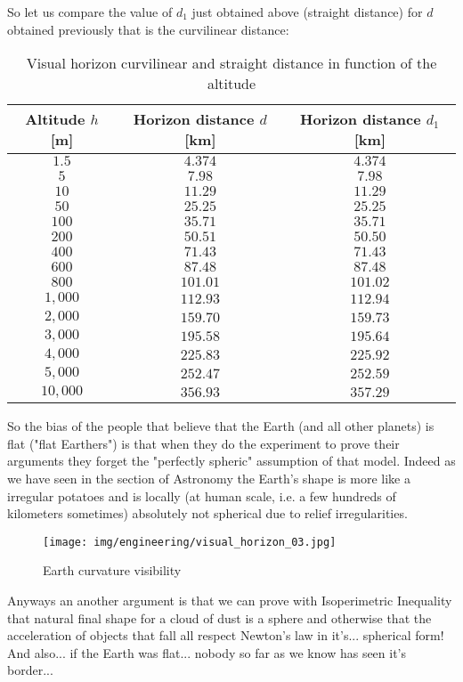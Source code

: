 	So let us compare the value of $d_1$ just obtained above (straight distance) for $d$ obtained previously that is the curvilinear distance:
	\begin{table}[H]
	\begin{center}
			\begin{tabular}{|c|c|c|}
				\hline
				\multicolumn{1}{c}{\cellcolor{black!30}\textbf{Altitude $h$ [m]}} & 
\multicolumn{1}{c}{\cellcolor{black!30}\textbf{Horizon distance $d$ [km]}}  & 
\multicolumn{1}{c}{\cellcolor{black!30}\textbf{Horizon distance $d_1$ [km]}} \\ \hline
		$1.5$ & $4.374$ & $4.374$\\ \hline
		$5$ & $7.98$ & $7.98$ \\ \hline
		$10$ & $11.29$ & $11.29$ \\ \hline
		$50$ & $25.25$ & $25.25$ \\ \hline
		$100$ & $35.71$ & $35.71$ \\ \hline
		$200$ & $50.51$ & $50.50$ \\ \hline
		$400$ & $71.43$ & $71.43$ \\ \hline
		$600$ & $87.48$ & $87.48$\\ \hline
		$800$ & $101.01$ & $101.02$\\ \hline
		$1,000$ & $112.93$ & $112.94$ \\ \hline
		$2,000$ & $159.70$ & $159.73$\\ \hline
		$3,000$ & $195.58$ & $195.64$\\ \hline
		$4,000$ & $225.83$ & $225.92$ \\ \hline
		$5,000$ & $252.47$ & $252.59$\\ \hline
		$10,000$ & $356.93$ & $357.29$ \\ \hline
	\end{tabular}
	\end{center}
	\caption{Visual horizon curvilinear and straight distance in function of the altitude}
	\end{table}
	So the bias of the people that believe that the Earth (and all other planets) is flat ("flat Earthers") is that when they do the experiment to prove their arguments they forget the "perfectly spheric" assumption of that model. Indeed as we have seen in the section of Astronomy the Earth's shape is more like a irregular potatoes and is locally (at human scale, i.e. a few hundreds of kilometers sometimes) absolutely not spherical due to relief irregularities.
	\begin{figure}[H]
		\begin{center}
			\texttt{[image: img/engineering/visual\_horizon\_03.jpg]}
			\caption{Earth curvature visibility}
		\end{center}	
	\end{figure}
	Anyways an another argument is that we can prove with Isoperimetric Inequality that natural final shape for a cloud of dust is a sphere and otherwise that the acceleration of objects that fall all respect Newton's law in it's... spherical form! And also... if the Earth was flat... nobody so far as we know has seen it's border...
	
